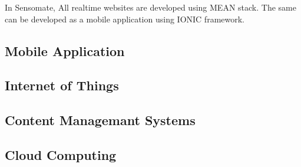 \documentclass[a4paper,12pt]{report}
\begin{document}
			In Sensomate, All realtime websites are developed using MEAN stack. The same can be developed as a mobile application using IONIC framework.
			\subsection{Mobile Application}
			\subsection{Internet of Things}
			\subsection{Content Managemant Systems}
			\subsection{Cloud Computing}
	
\end{document}
